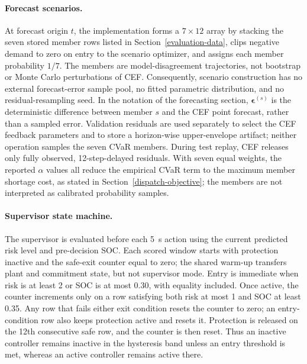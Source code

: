 \paragraph{Forecast scenarios.}
At forecast origin $t$, the implementation forms a $7\times12$ array by
stacking the seven stored member rows listed in Section~\ref{evaluation-data},
clips negative demand to zero on entry to the scenario optimizer, and assigns
each member probability $1/7$. The members are model-disagreement trajectories,
not bootstrap or Monte Carlo perturbations of CEF. Consequently, scenario
construction has no external forecast-error sample pool, no fitted parametric
distribution, and no residual-resampling seed. In the notation of the
forecasting section, $\boldsymbol\epsilon^{(s)}$ is the deterministic difference
between member $s$ and the CEF point forecast, rather than a sampled error.
Validation residuals are used separately to select the CEF feedback parameters
and to store a horizon-wise upper-envelope artifact; neither operation samples
the seven CVaR members. During test replay, CEF releases only fully observed,
12-step-delayed residuals.
With seven equal weights, the reported $\alpha$ values all reduce the empirical
CVaR term to the maximum member shortage cost, as stated in
Section~\ref{dispatch-objective}; the members are not interpreted as calibrated
probability samples.

\paragraph{Supervisor state machine.}
The supervisor is evaluated before each 5~s action using the current predicted
risk level and pre-decision SOC. Each scored window starts with protection
inactive and the safe-exit counter equal to zero; the shared warm-up transfers
plant and commitment state, but not supervisor mode. Entry is immediate when
risk is at least 2 or SOC is at most 0.30, with equality included. Once active,
the counter increments only on a row satisfying both risk at most 1 and SOC at
least 0.35. Any row that fails either exit condition resets the counter to zero;
an entry-condition row also keeps protection active and resets it. Protection
is released on the 12th consecutive safe row, and the counter is then reset.
Thus an inactive controller remains inactive in the hysteresis band unless an
entry threshold is met, whereas an active controller remains active there.

